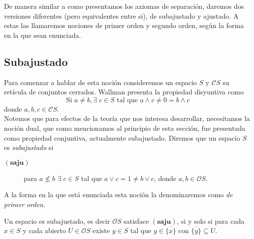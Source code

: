 \documentclass{comunicaciones}
\begin{document}
De manera similar a como presentamos los axiomas de separación, daremos dos versiones diferentes (pero equivalentes entre si), de subajustado y ajustado. A estas las llamaremos nociones de primer orden y segundo orden, según la forma en la que sean enunciada. 

\subsection{Subajustado}

Para comenzar a hablar de esta noción consideremos un espacio $S$ y $\mathcal{C}S$ su retícula de conjuntos cerrados. Wallman presenta la propiedad disyuntiva como
\[
\mbox{Si }a\neq b, \exists\; c\in S \mbox{ tal que }a\wedge c\neq 0=b\wedge c
\]
donde $a, b, c\in \mathcal{C}S$.\\

Notemos que para efectos de la teoría que nos interesa desarrollar, necesitamos la noción dual, que como mencionamos al principio de esta sección, fue presentada como propiedad conjuntiva, actualmente subajustado. Diremos que un espacio $S$ es \emph{subajustado} si

\begin{description}
    \item[$(\mathbf{saju})$] para $a\nleq b$ $\exists\; c\in S$ tal que $a\vee c=1\neq b\vee c$, donde $a,b\in \mathcal{O}S$.
\end{description}
A la forma en la que está enunciada esta noción la denominaremos como \emph{de primer orden}.

\begin{thm}\label{Saju1}
    Un espacio es subajustado, es decir $\mathcal{O}S$ satisface $(\mathbf{saju})$, si y solo si para cada $x\in S$ y cada abierto $U\in \mathcal{O}S$ existe $y\in S$ tal que $y\in \overline{\{x\}}$ con $\overline{\{y\}}\subseteq U$.
\end{thm}
\end{document}
